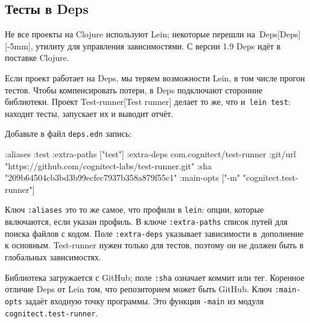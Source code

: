 \begin{english}
\end{english}

\subsection{Тесты в Deps}


Не все проекты на Clojure используют Lein; некоторые перешли
на~Deps[Deps][-5mm], утилиту для
управления зависимостями. С версии 1.9 Deps идёт в поставке Clojure.


Если проект работает на Deps, мы теряем возможности Lein, в том числе прогон
тестов. Чтобы компенсировать потери, в Deps подключают сторонние
библиотеки. Проект Test-runner[Test runner]
делает то же, что и~\verb|lein test|: находит тесты, запускает их и выводит
отчёт.

Добавьте в файл \verb|deps.edn| запись:

\begin{english}
  \begin{clojure}
:aliases
{:test
 {:extra-paths ["test"]
  :extra-deps
  {com.cognitect/test-runner
   {:git/url "https://github.com/cognitect-labs/test-runner.git"
    :sha "209b64504cb3bd3b99ecfec7937b358a879f55c1"}}
  :main-opts ["-m" "cognitect.test-runner"]}}
  \end{clojure}
\end{english}


Ключ \verb|:aliases| это то же самое, что профили в \verb|lein|: опции, которые
включаются, если указан профиль. В ключе \verb|:extra-paths| список путей для
поиска файлов с кодом. Поле \verb|:extra-deps| указывает зависимости
в~дополнение к основным. Test-runner нужен только для тестов, поэтому он не
должен быть в глобальных зависимостях.

Библиотека загружается с GitHub; поле \verb|:sha| означает коммит или
тег. Коренное отличие Deps от Lein том, что репозиторием может быть GitHub. Ключ
\verb|:main-opts| задаёт входную точку программы. Это функция \verb|-main|
из модуля \verb|cognitect.test-runner|.


